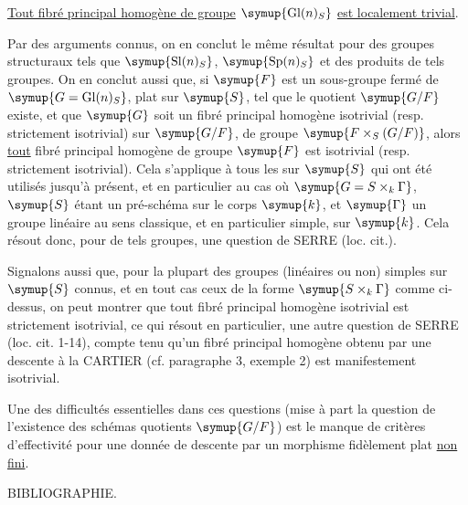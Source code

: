  \uline{Tout fibré principal homogène de groupe} $\symup{\operatorname{Gl}(n)_S}$ \uline{est localement trivial}.

Par des arguments connus, on en conclut le même résultat pour des groupes
structuraux tels que $\symup{\operatorname{Sl}(n)_S}$, $\symup{\operatorname{Sp}(n)_S}$ et des
produits de tels groupes. On en conclut aussi que, si $\symup{F}$ est un sous-groupe
fermé de $\symup{G=\operatorname{Gl}(n)_S}$, plat sur $\symup{S}$, tel que le quotient $\symup{G/F}$
existe, et que $\symup{G}$ soit un fibré principal homogène isotrivial (resp.
strictement isotrivial) sur $\symup{G/F}$, de groupe $\symup{F\times_S(G/F)}$, alors \uline{tout} fibré
principal homogène de groupe $\symup{F}$ est isotrivial (resp. strictement isotrivial).
Cela s'applique à tous les  sur $\symup{S}$ qui ont été utilisés
jusqu'à présent, et en particulier au cas où $\symup{G=S\times_k\Gamma}$, $\symup{S}$ étant un
pré-schéma sur le corps $\symup{k}$, et $\symup{\Gamma}$ un groupe linéaire au sens classique,
et en particulier simple, sur $\symup{k}$. Cela résout donc, pour de tels groupes, une
question de SERRE (loc. cit.).

Signalons aussi que, pour la plupart des groupes (linéaires ou non) simples sur
$\symup{S}$ connus, et en tout cas ceux de la forme $\symup{S\times_k\Gamma}$ comme ci-dessus,
on peut montrer que tout fibré principal homogène isotrivial est strictement
isotrivial, ce qui résout en particulier, une autre question de SERRE (loc.
cit. 1-14), compte tenu qu'un fibré principal homogène obtenu par une
descente à la CARTIER (cf. paragraphe 3, exemple 2) est manifestement
isotrivial.

 Une des difficultés essentielles dans ces questions (mise
à part la question de l'existence des schémas quotients $\symup{G/F}$) est le manque de
critères d'effectivité pour une donnée de descente par un morphisme fidèlement
plat \uline{non fini}.

\begin{center}
  BIBLIOGRAPHIE.
\end{center}

